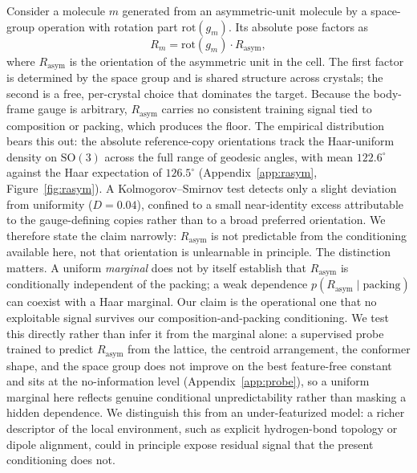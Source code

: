 \documentclass[10pt]{article}
\begin{document}
Consider a molecule $m$ generated from an asymmetric-unit molecule by a
space-group operation with rotation part $\mathrm{rot}(g_m)$. Its absolute pose
factors as
\begin{equation}
R_m = \mathrm{rot}(g_m)\cdot R_{\text{asym}},
\label{eq:decomp}
\end{equation}
where $R_{\text{asym}}$ is the orientation of the asymmetric unit in the cell.
The first factor is determined by the space group and is shared structure across
crystals; the second is a free, per-crystal choice that dominates the target.
Because the body-frame gauge is arbitrary, $R_{\text{asym}}$ carries no
consistent training signal tied to composition or packing, which produces the
floor. The empirical distribution bears this out: the absolute reference-copy
orientations track the Haar-uniform density on $\mathrm{SO}(3)$ across the full
range of geodesic angles, with mean $122.6^\circ$ against the Haar expectation of
$126.5^\circ$ (Appendix~\ref{app:rasym}, Figure~\ref{fig:rasym}). A
Kolmogorov--Smirnov test detects only a
slight deviation from uniformity ($D=0.04$), confined to a small near-identity
excess attributable to the gauge-defining copies rather than to a broad preferred
orientation. We therefore state the claim narrowly: $R_{\text{asym}}$ is not
predictable from the conditioning available here, not that orientation is
unlearnable in principle. The distinction matters. A uniform \emph{marginal}
does not by itself establish that $R_{\text{asym}}$ is conditionally
independent of the packing; a weak dependence $p(R_{\text{asym}}\mid\text{packing})$
can coexist with a Haar marginal. Our claim is the operational one that no
exploitable signal survives our composition-and-packing conditioning. We test
this directly rather than infer it from the marginal alone: a supervised probe
trained to predict $R_{\text{asym}}$ from the lattice, the centroid arrangement,
the conformer shape, and the space group does not improve on the best
feature-free constant and sits at the no-information level
(Appendix~\ref{app:probe}), so a uniform marginal here reflects genuine conditional
unpredictability rather than masking a hidden dependence. We distinguish this
from an under-featurized model: a richer descriptor of the local environment,
such as explicit hydrogen-bond topology or dipole alignment, could in principle
expose residual signal that the present conditioning does not.
\end{document}
